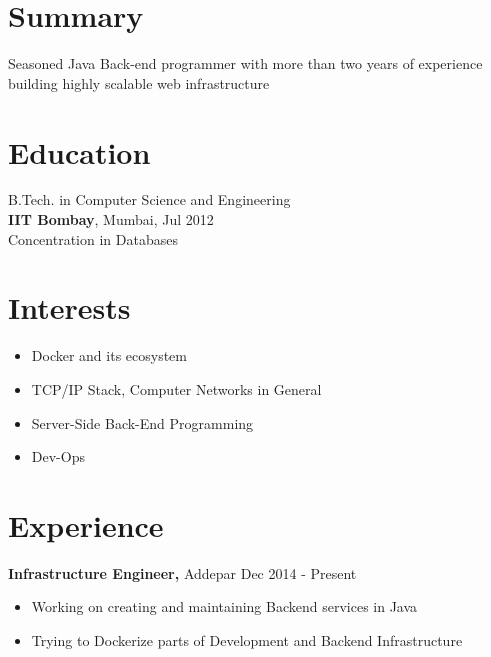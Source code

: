 \documentclass[margin]{res}
\begin{document}

\address{ \href{http://ankush.io/}{http://ankush.io} }
\address{ \textbf{Email} : ankush@ankush.io }

\begin{resume}

\section{Summary}
  Seasoned Java Back-end programmer with more than two years of experience building highly scalable web infrastructure

\section{Education}
  B.Tech. in Computer Science and Engineering \\
  {\bf IIT Bombay}, Mumbai, Jul 2012 \\
  Concentration in Databases

\section{Interests}
 \begin{itemize} \itemsep -2pt  %
 \item Docker and its ecosystem
 \item TCP/IP Stack, Computer Networks in General
 \item Server-Side Back-End Programming
 \item Dev-Ops
 \end{itemize}

\section{Experience}
 {\bf Infrastructure Engineer,} Addepar \hfill Dec  2014  - Present
 \begin{itemize} \itemsep -2pt  %
 \item Working on creating and maintaining Backend services in Java
 \item Trying to Dockerize parts of Development and Backend Infrastructure
 \end{itemize}


\end{resume}
\end{document}
